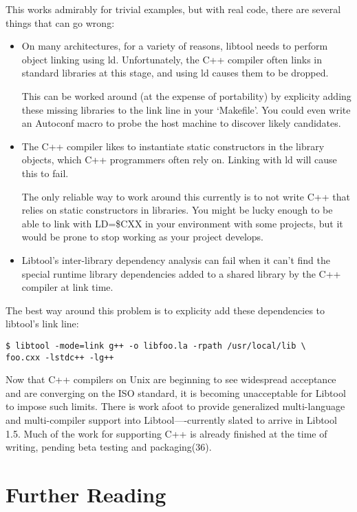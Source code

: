 This works admirably for trivial examples, but with real code, there are several things that can go wrong:
\begin{itemize}
    \item On many architectures, for a variety of reasons, libtool needs to perform object linking using ld. Unfortunately, the C++ compiler often links in standard libraries at this stage, and using ld causes them to be dropped.

      This can be worked around (at the expense of portability) by explicity adding these missing libraries to the link line in your `Makefile'. You could even write an Autoconf macro to probe the host machine to discover likely candidates.

    \item The C++ compiler likes to instantiate static constructors in the library objects, which C++ programmers often rely on. Linking with ld will cause this to fail.

The only reliable way to work around this currently is to not write 
C++ that relies on static constructors in libraries. You might be lucky 
enough to be able to link with LD=\$CXX in your environment with some projects, but it would be prone to stop working as your project develops.

    \item Libtool's inter-library dependency analysis can fail when it can't find the special runtime library dependencies added to a shared library by the C++ compiler at link time.
\end{itemize}

      The best way around this problem is to explicity add these dependencies to libtool's link line: 

\begin{Verbatim}[frame=single]
$ libtool -mode=link g++ -o libfoo.la -rpath /usr/local/lib \
foo.cxx -lstdc++ -lg++
\end{Verbatim}

Now that C++ compilers on Unix are beginning to see widespread acceptance and are converging on the ISO standard, it is becoming unacceptable for Libtool to impose such limits. There is work afoot to provide generalized multi-language and multi-compiler support into Libtool----currently slated to arrive in Libtool 1.5. Much of the work for supporting C++ is already finished at the time of writing, pending beta testing and packaging(36).


\section{Further Reading}

